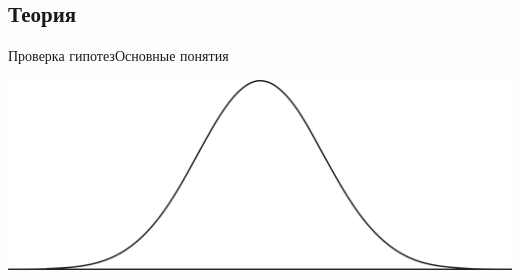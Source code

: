 \documentclass[11pt,pdf,utf8,hyperref={unicode},aspectratio=169]{beamer}
\begin{document}
\subsection{Теория}
\begin{frame}{Проверка гипотез}{Основные понятия}
%
%
    \begin{minipage}{0.20\textwidth}
        \includegraphics[width=1\textwidth]{stats1.png}

\end{minipage}
\end{frame}
\end{document}
